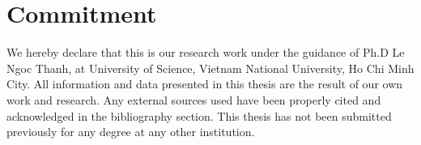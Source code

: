 \chapter*{Commitment}
\label{thanks}
We hereby declare that this is our research work under the guidance of Ph.D Le Ngoc Thanh, at University of Science, Vietnam National University, Ho Chi Minh City. All information and data presented in this thesis are the result of our own work and research. Any external sources used have been properly cited and acknowledged in the bibliography section. This thesis has not been submitted previously for any degree at any other institution.